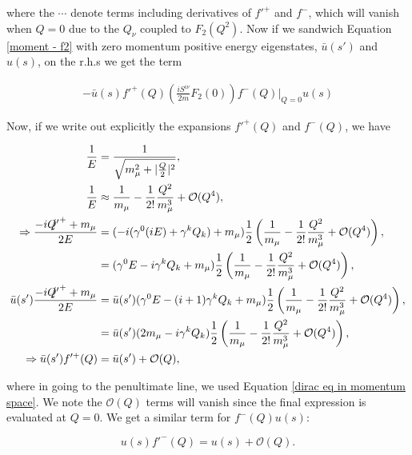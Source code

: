 \documentclass{article}
\numberwithin{equation}{section} %
\begin{document}
\noindent where the $\cdots$ denote terms including derivatives of $f'^+$ and $f^-$, which will vanish when $Q=0$ due to the $Q_\nu$ coupled to $F_2(Q^2)$. Now if we sandwich Equation \ref{moment - f2} with zero momentum positive energy eigenstates, $\bar{u}(s')$ and $u(s)$, on the r.h.s we get the term

\begin{equation}
\begin{split}
-\bar{u}(s)f'^+(Q)\left( \frac{iS^{i\nu}}{2m}F_2(0)\right)f^-(Q)\bigg\vert_{Q=0} u(s)
\end{split}
\end{equation}

Now, if we write out explicitly the expansions $f'^+(Q)$ and $f^-(Q)$, we have

\begin{align*}
\frac{1}{E} &= \frac{1}{\sqrt{m_\mu^2 + |\frac{Q}{2}|^2}},\\
\frac{1}{E} &\approx \frac{1}{m_\mu} -\frac{1}{2!}\frac{Q^2}{m_\mu^3} + \mathcal{O}(Q^4),\\
\Rightarrow\frac{-i\slashed{Q'}^++m_\mu}{2E} &= (-i(\gamma^0(iE) + \gamma^kQ_k) +m_\mu)\frac{1}{2}\left(\frac{1}{m_\mu} -\frac{1}{2!}\frac{Q^2}{m_\mu^3} + \mathcal{O}(Q^4)\right),\\
&= (\gamma^0E - i\gamma^kQ_k +m_\mu)\frac{1}{2}\left(\frac{1}{m_\mu} -\frac{1}{2!}\frac{Q^2}{m_\mu^3} + \mathcal{O}(Q^4)\right),\\
\bar{u}(s')\frac{-i\slashed{Q'}^++m_\mu}{2E} &= \bar{u}(s')(\gamma^0E - (i+1)\gamma^kQ_k +m_\mu)\frac{1}{2}\left(\frac{1}{m_\mu} -\frac{1}{2!}\frac{Q^2}{m_\mu^3} + \mathcal{O}(Q^4)\right),\\
&= \bar{u}(s')(2m_\mu - i\gamma^kQ_k)\frac{1}{2}\left(\frac{1}{m_\mu} -\frac{1}{2!}\frac{Q^2}{m_\mu^3} + \mathcal{O}(Q^4)\right),\\
\Rightarrow \bar{u}(s')f'^+(Q)&= \bar{u}(s')+\mathcal{O}(Q),\\
\end{align*}

\noindent where in going to the penultimate line, we used Equation \ref{dirac eq in momentum space}. We note the $\mathcal{O}(Q)$ terms will vanish since the final expression is evaluated at $Q=0$. We get a similar term for $f^-(Q)u(s)$:

\begin{equation}
u(s)f'^-(Q)= u(s)+\mathcal{O}(Q).
\end{equation}


%
%
%
\end{document}
